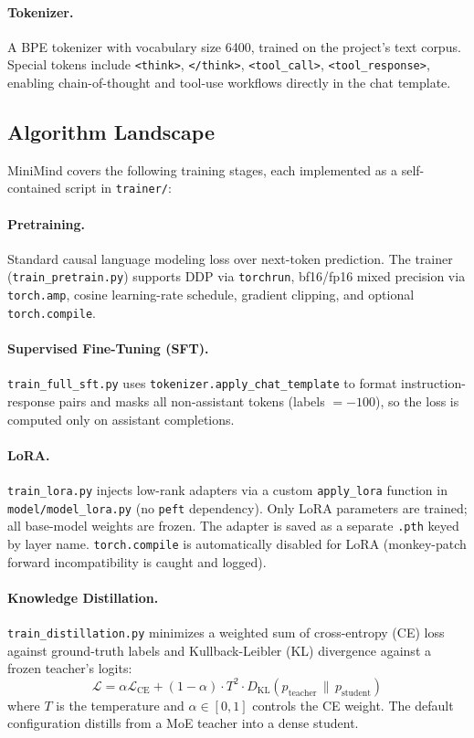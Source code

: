\paragraph{Tokenizer.}
A BPE tokenizer with vocabulary size 6400, trained on the project's text corpus.
Special tokens include \texttt{<think>}, \texttt{</think>},
\texttt{<tool\_call>}, \texttt{<tool\_response>}, enabling chain-of-thought and
tool-use workflows directly in the chat template.

\subsection{Algorithm Landscape}
\label{sec:background:algos}

MiniMind covers the following training stages, each implemented as a self-contained
script in \texttt{trainer/}:

\paragraph{Pretraining.}
Standard causal language modeling loss over next-token prediction.  The trainer
(\texttt{train\_pretrain.py}) supports DDP via \texttt{torchrun}, bf16/fp16 mixed
precision via \texttt{torch.amp}, cosine learning-rate schedule, gradient
clipping, and optional \texttt{torch.compile}.

\paragraph{Supervised Fine-Tuning (SFT).}
\texttt{train\_full\_sft.py} uses \texttt{tokenizer.apply\_chat\_template} to
format instruction-response pairs and masks all non-assistant tokens
(labels $= -100$), so the loss is computed only on assistant completions.

\paragraph{LoRA.}
\texttt{train\_lora.py} injects low-rank adapters via a custom
\texttt{apply\_lora} function in \texttt{model/model\_lora.py} (no \texttt{peft}
dependency).  Only LoRA parameters are trained; all base-model weights are
frozen.  The adapter is saved as a separate \texttt{.pth} keyed by layer name.
\texttt{torch.compile} is automatically disabled for LoRA (monkey-patch forward
incompatibility is caught and logged).

\paragraph{Knowledge Distillation.}
\texttt{train\_distillation.py} minimizes a weighted sum of cross-entropy (CE)
loss against ground-truth labels and Kullback-Leibler (KL) divergence against
a frozen teacher's logits:
\[
  \mathcal{L} = \alpha \mathcal{L}_{\text{CE}} + (1 - \alpha)
    \cdot T^2 \cdot D_{\text{KL}}(p_{\text{teacher}} \,\|\, p_{\text{student}})
\]
where $T$ is the temperature and $\alpha \in [0,1]$ controls the CE weight.
The default configuration distills from a MoE teacher into a dense student.

